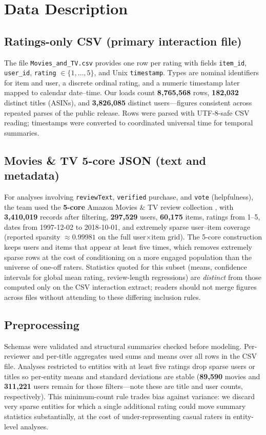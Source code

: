 \documentclass[conference]{IEEEtran}
\begin{document}
\section{Data Description}
\subsection{Ratings-only CSV (primary interaction file)}
The file \texttt{Movies\_and\_TV.csv} provides one row per rating with fields \texttt{item\_id}, \texttt{user\_id}, \texttt{rating} $\in \{1,\ldots,5\}$, and Unix \texttt{timestamp}. Types are nominal identifiers for item and user, a discrete ordinal rating, and a numeric timestamp later mapped to calendar date--time. Our loads count \textbf{8{,}765{,}568} rows, \textbf{182{,}032} distinct titles (ASINs), and \textbf{3{,}826{,}085} distinct users---figures consistent across repeated parses of the public release. Rows were parsed with UTF-8-safe CSV reading; timestamps were converted to coordinated universal time for temporal summaries.

\subsection{Movies \& TV 5-core JSON (text and metadata)}
For analyses involving \texttt{reviewText}, \texttt{verified} purchase, and \texttt{vote} (helpfulness), the team used the \textbf{5-core} Amazon Movies \& TV review collection \cite{mcauley2018}, with \textbf{3{,}410{,}019} records after filtering, \textbf{297{,}529} users, \textbf{60{,}175} items, ratings from 1--5, dates from 1997-12-02 to 2018-10-01, and extremely sparse user--item coverage (reported sparsity $\approx 0.99981$ on the full user$\times$item grid). The 5-core construction keeps users and items that appear at least five times, which removes extremely sparse rows at the cost of conditioning on a more engaged population than the universe of one-off raters. Statistics quoted for this subset (means, confidence intervals for global mean rating, review-length regressions) are \emph{distinct} from those computed only on the CSV interaction extract; readers should not merge figures across files without attending to these differing inclusion rules.

\subsection{Preprocessing}
Schemas were validated and structural summaries checked before modeling. Per-reviewer and per-title aggregates used sums and means over all rows in the CSV file. Analyses restricted to entities with at least five ratings drop sparse users or titles so per-entity means and standard deviations are stable (\textbf{89{,}590} movies and \textbf{311{,}221} users remain for those filters---note these are title and user counts, respectively). This minimum-count rule trades bias against variance: we discard very sparse entities for which a single additional rating could move summary statistics substantially, at the cost of under-representing casual raters in entity-level analyses.
\end{document}
